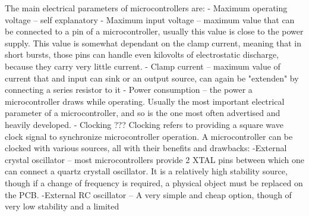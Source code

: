 \sol The main electrical parameters of microcontrollers are: \newline
    - Maximum operating voltage -- self explanatory  \newline
    - Maximum input voltage -- maximum value that can be connected to a pin of a microcontroller, \newline
                              usually this value is close to the power supply. This value is  \newline
                              somewhat dependant on the clamp current, meaning that in short \newline
                              bursts, those pins can handle even kilovolts of electrostatic \newline
                              discharge, because they carry very little current. \newline
    - Clamp current -- maximum value of current that and input can sink or an output source, \newline
                      can again be "extenden" by connecting a series resistor to it \newline
    - Power consumption -- the power a microcontroller draws while operating. Usually the  \newline
                          most important electrical parameter of a microcontroller, \newline
                          and so is the one most often advertised and heavily developed. \newline
    - Clocking ??? \newline
{}
\sol Clocking refers to providing a square wave clock signal to synchronize microcontroller operation.
     A microcontroller can be clocked with various sources, all with their benefits and drawbacks: \newline
     -External crystal oscillator -- most microcontrollers provide 2 XTAL pins between which one can \newline
                                    connect a quartz crystall oscillator. It is a relatively high stability \newline
                                    source, though if a change of frequency is required, a physical object \newline
                                    must be replaced on the PCB. \newline
     -External RC oscillator -- A very simple and cheap option, though of very low stability and a limited \newline
